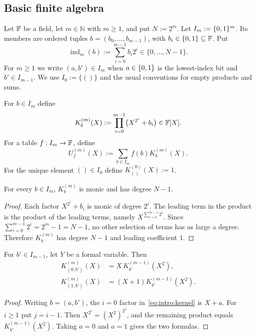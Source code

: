\subsection{Basic finite algebra}\label{sec:intro:base}

\begin{definition}\label{def:intro:indices}
Let $\mathbb{F}$ be a field, let $m\in\mathbb N$ with $m\geq1$, and put $N:=2^m$. Let $I_m:=\{0,1\}^m$. Its members are ordered tuples $b=(b_0,\ldots,b_{m-1})$, with $b_i\in\{0,1\}\subseteq\mathbb{F}$. Put
\[
 \operatorname{ind}_m(b):=\sum_{i=0}^{m-1}b_i2^i\in\{0,\ldots,N-1\}.
\]
For $m\geq1$ we write $(a,b')\in I_m$ when $a\in\{0,1\}$ is the lowest-index bit and $b'\in I_{m-1}$. We use $I_0:=\{()\}$ and the usual conventions for empty products and sums.
\end{definition}

\begin{definition}\label{def:intro:kernel}
For $b\in I_m$ define
\begin{equation}\label{eq:intro:kernel}
 K_b^{(m)}(X):=\prod_{i=0}^{m-1}\bigl(X^{2^i}+b_i\bigr)\in\mathbb{F}[X].
\end{equation}
For a table $f:I_m\rightarrow\mathbb{F}$, define
\begin{equation}\label{eq:intro:encoding}
 U_f^{(m)}(X):=\sum_{b\in I_m}f(b)K_b^{(m)}(X).
\end{equation}
For the unique element $()\in I_0$ define $K_{()}^{(0)}(X):=1$.
\end{definition}

\begin{lemma}\label{lem:intro:degree}
For every $b\in I_m$, $K_b^{(m)}$ is monic and has degree $N-1$.
\end{lemma}
\begin{proof}
Each factor $X^{2^i}+b_i$ is monic of degree $2^i$. The leading term in the product is the product of the leading terms, namely $X^{\sum_{i=0}^{m-1}2^i}$. Since $\sum_{i=0}^{m-1}2^i=2^m-1=N-1$, no other selection of terms has as large a degree. Therefore $K_b^{(m)}$ has degree $N-1$ and leading coefficient $1$.
\end{proof}

\begin{lemma}\label{lem:intro:recursion}
For $b'\in I_{m-1}$, let $Y$ be a formal variable. Then
\begin{align}
K_{(0,b')}^{(m)}(X)&=X\,K_{b'}^{(m-1)}(X^2),\label{eq:intro:rec0}\\
K_{(1,b')}^{(m)}(X)&=(X+1)K_{b'}^{(m-1)}(X^2).\label{eq:intro:rec1}
\end{align}
\end{lemma}
\begin{proof}
Writing $b=(a,b')$, the $i=0$ factor in~\eqref{eq:intro:kernel} is $X+a$. For $i\geq1$ put $j=i-1$. Then $X^{2^i}=(X^2)^{2^j}$, and the remaining product equals $K_{b'}^{(m-1)}(X^2)$. Taking $a=0$ and $a=1$ gives the two formulas.
\end{proof}

